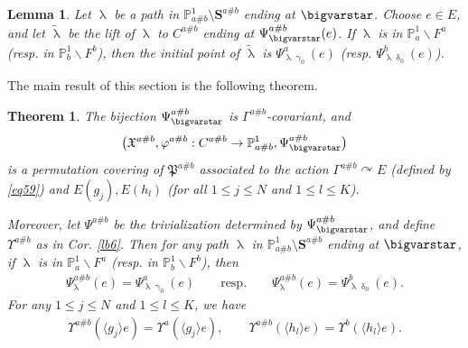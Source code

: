 \documentclass[11pt,b5paper,notitlepage]{article}
\theoremstyle{definition}
\theoremstyle{plain}
\newtheorem{thm}[df]{Theorem}
\newtheorem{lm}[df]{Lemma}
\newcommand{\fk}{\mathfrak}
\newcommand{\wtd}{\widetilde}
\newcommand{\bk}[1]{\langle {#1}\rangle}
\newcommand{\Pbb}{\mathbb P}
\newcommand{\Sbf}{\mathbf{S}}
\numberwithin{equation}{subsection}
\begin{document}
\begin{lm}\label{lb33}
Let $\uplambda$ be a path in $\Pbb^1_{a\#b}\setminus\Sbf^{a\#b}$ ending at $\bigvarstar$. Choose $e\in E$, and let $\wtd\uplambda$ be the lift of $\uplambda$ to $C^{a\#b}$ ending at $\Psi_\bigvarstar^{a\#b}(e)$. If $\uplambda$ is in $\Pbb^1_a\backslash F^a$ (resp. in $\Pbb^1_b\backslash F^b$), then the initial point of $\wtd\uplambda$ is $\Psi^a_{\uplambda\upgamma_0}(e)$ (resp. $\Psi^b_{\uplambda\updelta_0}(e)$).
\end{lm}



The main result of this section is the following theorem.

\begin{thm}\label{lb46}
The bijection $\Psi^{a\#b}_\bigvarstar$ is $\Gamma^{a\#b}$-covariant, and 
\begin{align*}
\big(\fk X^{a\#b},\varphi^{a\#b}:C^{a\#b}\rightarrow\Pbb^1_{a\#b},\Psi^{a\#b}_\bigvarstar\big)	
\end{align*}
is a permutation covering of $\fk P^{a\#b}$ associated to the action $\Gamma^{a\#b}\curvearrowright E$ (defined by \eqref{eq59}) and $E(g_j),E(h_l)$ (for all $1\leq j\leq N$ and $1\leq l\leq K$). 

Moreover, let $\Psi^{a\#b}$ be the trivialization determined by $\Psi^{a\#b}_\bigvarstar$, and define $\Upsilon^{a\#b}$ as in Cor. \ref{lb6}.  Then for any path $\uplambda$ in $\Pbb^1_{a\#b}\setminus\Sbf^{a\#b}$ ending at $\bigvarstar$, if $\uplambda$ is in $\Pbb^1_a\backslash F^a$ (resp. in $\Pbb^1_b\backslash F^b$), then
\begin{align}
\Psi_\uplambda^{a\#b}(e)=\Psi^a_{\uplambda\upgamma_0}(e)\qquad\text{resp.}\qquad\Psi_\uplambda^{a\#b}(e)=\Psi^b_{\uplambda\updelta_0}(e).\label{eq62}
\end{align}
For any $1\leq j\leq N$ and $1\leq l\leq K$, we have
\begin{align}
\Upsilon^{a\#b}(\bk{g_j}e)=\Upsilon^a(\bk{g_j}e),\qquad 	\Upsilon^{a\#b}(\bk{h_l}e)=\Upsilon^b(\bk{h_l}e).\label{eq63}
\end{align}
\end{thm}
\end{document}
